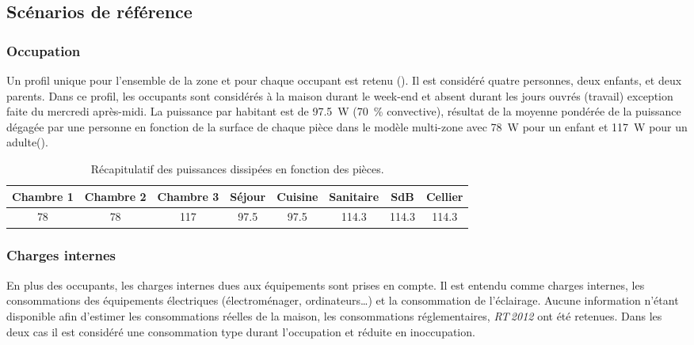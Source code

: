 \subsection{Scénarios de référence} %
\label{sub:scenarios_de_reference}
\subsubsection{Occupation} %
\label{ssub:profil_d_occupation}
Un profil unique pour l’ensemble de la zone et pour chaque occupant est retenu
(). Il est considéré quatre personnes, deux enfants, et
deux parents. Dans ce profil, les occupants sont considérés à la maison durant le week-end
et absent durant les jours ouvrés (travail) exception faite du mercredi après-midi. La
puissance par habitant est de \SI{97.5}{\watt} (\SI{70}{\percent} convective), résultat de
la moyenne pondérée de la puissance dégagée par une personne en fonction de la surface de
chaque pièce dans le modèle multi-zone avec \SI{78}{\watt} pour un enfant et \SI{117}{\watt}
pour un adulte().

\begin{table}
\centering
\caption[Récapitulatif des puissances dissipées en fonction des pièces]
        {Récapitulatif des puissances dissipées en fonction des pièces.}
\label{tab:puissance_occupants}
\begin{tabular}{*8{c}}
    \toprule
    Chambre 1 & Chambre 2  & Chambre 3 & Séjour     & Cuisine    & Sanitaire   & SdB         & Cellier     \\
    \midrule
    \num{78}  & \num{78}   & \num{117} & \num{97.5} & \num{97.5} & \num{114.3} & \num{114.3} & \num{114.3} \\
    \bottomrule
\end{tabular}
\end{table}


\subsubsection{Charges internes} %
\label{ssub:charges_internes}
En plus des occupants, les charges internes dues aux équipements sont prises en compte. Il
est entendu comme charges internes, les consommations des équipements électriques
(électroménager, ordinateurs\dots) et la consommation de l’éclairage. Aucune information
n’étant disponible afin d’estimer les consommations réelles de la maison, les
consommations réglementaires, \textit{RT\,2012} \parencite{CSTB2011} ont été retenues.
Dans les deux cas il est considéré une consommation type durant l’occupation
et réduite en inoccupation.

